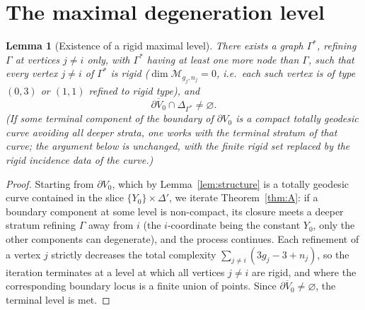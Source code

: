\documentclass[11pt]{amsart}
\newtheorem{lemma}[theorem]{Lemma}
\theoremstyle{definition}
\theoremstyle{remark}
\newcommand{\M}{\mathcal{M}}
\begin{document}
\section{The maximal degeneration level}

\begin{lemma}[Existence of a rigid maximal level]\label{lem:max}
There exists a graph $\Gamma^*$, refining $\Gamma$ at vertices $j\neq i$
only, with $\Gamma^*$ having at least one more node than $\Gamma$, such
that every vertex $j\neq i$ of $\Gamma^*$ is rigid
($\dim\M_{g_j,n_j}=0$, i.e.\ each such vertex is of type $(0,3)$ or
$(1,1)$ refined to rigid type), and
\[
\overline{\partial V_0}\cap\Delta_{\Gamma^*}\neq\varnothing .
\]
(If some terminal component of the boundary of $\partial V_0$ is a compact
totally geodesic curve avoiding all deeper strata, one works with the
terminal stratum of that curve; the argument below is unchanged, with the
finite rigid set replaced by the rigid incidence data of the curve.)
\end{lemma}

\begin{proof}
Starting from $\partial V_0$, which by Lemma~\ref{lem:structure} is a
totally geodesic curve contained in the slice $\{Y_0\}\times\Delta'$, we
iterate Theorem~\ref{thm:A}: if a boundary component at some level is
non-compact, its closure meets a deeper stratum refining $\Gamma$ away from
$i$ (the $i$-coordinate being the constant $Y_0$, only the other components
can degenerate), and the process continues. Each refinement of a vertex
$j$ strictly decreases the total complexity
$\sum_{j\neq i}(3g_j-3+n_j)$, so the iteration terminates at a level at
which all vertices $j\neq i$ are rigid, and where the corresponding
boundary locus is a finite union of points. Since
$\overline{\partial V_0}\neq\varnothing$, the terminal level is met.
\end{proof}
\end{document}
